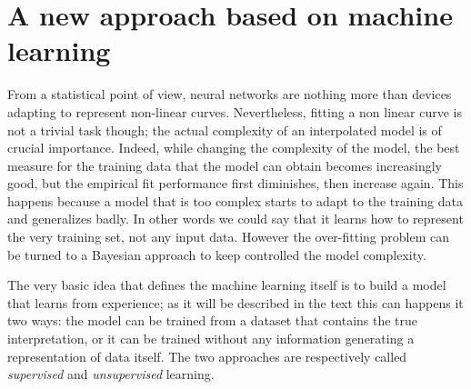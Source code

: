 \section{A new approach based on machine learning}

From a statistical point of view, neural networks are nothing more than devices adapting to represent non-linear curves. 
Nevertheless, fitting a non linear curve is not a trivial task though; the actual complexity of an interpolated model is of crucial importance. 
Indeed, while changing the complexity of the model, the best measure for the training data that the model can obtain becomes increasingly good, but the empirical fit performance first diminishes, then increase again. This happens because a model that is too complex starts to adapt to the training data and generalizes badly. In other words we could say that it learns how to represent the very training set, not any input data.
However the over-fitting problem can be turned to a Bayesian approach to keep controlled the model complexity.

The very basic idea that defines the machine learning itself is to build a model that learns from experience; as it will be described in the text this can happens it two ways: the model can be trained from a dataset that contains the true interpretation, or it can be trained without any information generating a representation of data itself. The two approaches are respectively called \textit{supervised} and \textit{unsupervised} learning.


